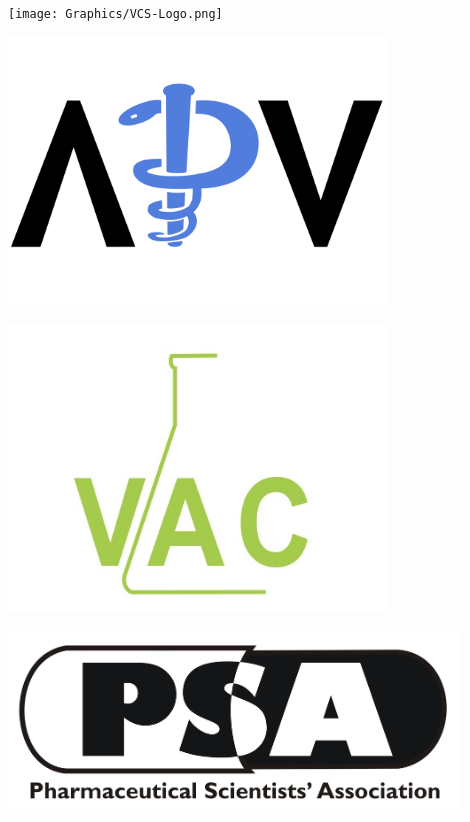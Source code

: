 \documentclass{article}
\begin{document}
\begin{center}
  \begin{minipage}{0.24\textwidth}
    \centering
    \texttt{[image: Graphics/VCS-Logo.png]}
  \end{minipage}
  \hfill
  \begin{minipage}{0.24\textwidth}
    \centering
    \includegraphics[width=0.75\textwidth]{Graphics/NewLogo_PNG.png}
  \end{minipage}
  \hfill
  \begin{minipage}{0.24\textwidth}
    \centering
    \includegraphics[width=0.75\textwidth]{Graphics/VAC_logo_vector-2.jpeg}
  \end{minipage}
  \hfill
  \begin{minipage}{0.24\textwidth}
    \centering
    \includegraphics[width=0.9\textwidth]{Graphics/PSA_logo.jpg}
  \end{minipage}
\end{center}
\end{document}
